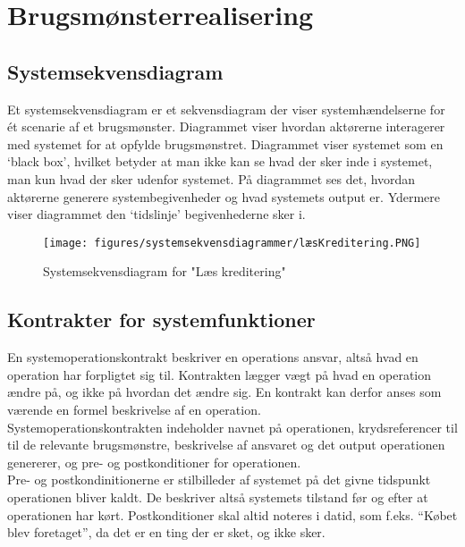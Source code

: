 \section{Brugsmønsterrealisering}

\subsection{Systemsekvensdiagram}
Et systemsekvensdiagram er et sekvensdiagram der viser systemhændelserne for ét scenarie af et
brugsmønster. Diagrammet viser hvordan aktørerne interagerer med systemet for at opfylde
brugsmønstret. Diagrammet viser systemet som en ‘black box’, hvilket betyder at man ikke kan se
hvad der sker inde i systemet, man kun hvad der sker udenfor systemet. På diagrammet ses det,
hvordan aktørerne generere systembegivenheder og hvad systemets output er. Ydermere viser
diagrammet den ‘tidslinje’ begivenhederne sker i. \\

\noindent
{}

\begin{figure}[h]
\centering
\texttt{[image: figures/systemsekvensdiagrammer/læsKreditering.PNG]}
\caption{Systemsekvensdiagram for "Læs kreditering"}
\label{fig:read_credit}
\end{figure}


\subsection{Kontrakter for systemfunktioner}
En systemoperationskontrakt beskriver en operations ansvar, altså hvad en operation har forpligtet
sig til. Kontrakten lægger vægt på hvad en operation ændre på, og ikke på hvordan det
ændre sig. En kontrakt kan derfor anses som værende en formel beskrivelse af en operation.\\
Systemoperationskontrakten indeholder navnet på operationen, krydsreferencer til til de relevante
brugsmønstre, beskrivelse af ansvaret og det output operationen genererer, og pre- og
postkonditioner for operationen. \\
Pre- og postkondinitionerne er stilbilleder af systemet på det givne tidspunkt operationen bliver
kaldt. De beskriver altså systemets tilstand før og efter at operationen har kørt. Postkonditioner skal
altid noteres i datid, som f.eks. “Købet blev foretaget”, da det er en ting der er sket, og ikke sker.\\

